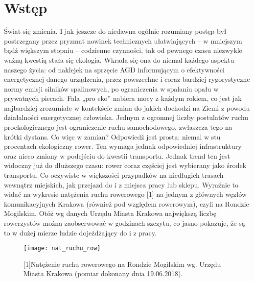 \chapter{Wstęp}
\label{cha:wstep}

Świat się zmienia. I jak jeszcze do niedawna ogólnie rozumiany postęp był postrzegany przez pryzmat nowinek technicznych ułatwiających – w mniejszym bądź większym stopniu – codzienne czynności, tak od pewnego czasu niezwykle ważną kwestią stała się ekologia. Wkrada się ona do niemal każdego aspektu naszego życia: od naklejek na sprzęcie AGD informującym o efektywności energetycznej danego urządzenia, przez powszechne i coraz bardziej rygorystyczne normy emisji silników spalinowych, po ograniczenia w spalaniu opału w prywatnych piecach. Fala „pro eko” nabiera mocy z każdym rokiem, co jest jak najbardziej zrozumiałe w kontekście zmian do jakich dochodzi na Ziemi z powodu działalności energetycznej człowieka. Jednym z ogromnej liczby postulatów ruchu proekologicznego jest ograniczenie ruchu samochodowego, zwłaszcza tego na krótki dystans. Co więc w zamian? Odpowiedź jest prosta: niemal w stu procentach ekologiczny rower. Ten wymaga jednak odpowiedniej infrastruktury oraz nieco zmiany w podejściu do kwestii transportu. \newline
Jednak trend ten jest widoczny już do dłuższego czasu: rower coraz częściej jest wybierany jako środek transportu. Co oczywiste w większości przypadków na niedługich trasach wewnątrz miejskich, jak przejazd do i z miejsca pracy lub sklepu. Wyraźnie to widać na wykresie natężenia ruchu rowerowego [1] na jednym z głównych węzłów komunikacyjnych Krakowa (również pod względem rowerowym), czyli na Rondzie Mogilskim. Otóż wg danych Urzędu Miasta Krakowa największą liczbę rowerzystów można zaobserwować w godzinach szczytu, co jasno pokazuje, że są to w dużej mierze ludzie dojeżdżający do i z pracy.
\begin{figure}[H]
\centering
\texttt{[image: nat\_ruchu\_row]}
\caption{[1]Natężenie ruchu rowerowego na Rondzie Mogilskim wg. Urzędu Miasta Krakowa (pomiar dokonany dnia 19.06.2018).}
\end{figure}
